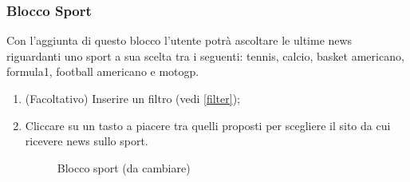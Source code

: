 \subsubsection{Blocco Sport}
Con l'aggiunta di questo blocco l'utente potrà ascoltare le ultime news riguardanti uno sport a sua scelta tra i seguenti: tennis, calcio, basket americano, formula1, football americano e motogp.
\begin{enumerate}
	\item (Facoltativo) Inserire un filtro (vedi \ref{filter});
	\item Cliccare su un tasto a piacere tra quelli proposti per scegliere il sito da cui ricevere news sullo sport.
	\begin{figure}[!ht]
		\centering
		\caption{Blocco sport (da cambiare)}
	\end{figure}
\end{enumerate}
\newpage
